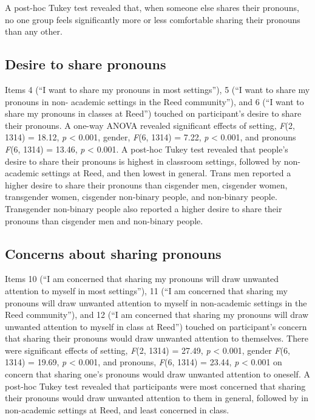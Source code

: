 \documentclass[12pt,twoside]{reedthesis}
\begin{document}
A post-hoc Tukey test revealed that, when someone else shares their pronouns, no one group feels significantly more or less comfortable sharing their pronouns than any other.

\hypertarget{desire-to-share-pronouns}{%
\subsection{Desire to share pronouns}\label{desire-to-share-pronouns}}

Items 4 (``I want to share my pronouns in most settings''), 5 (``I want to share my pronouns in non- academic settings in the Reed community''), and 6 (``I want to share my pronouns in classes at Reed'') touched on participant's desire to share their pronouns. A one-way ANOVA revealed significant effects of setting, \emph{F}(2, 1314) = 18.12, \emph{p} \textless{} 0.001, gender, \emph{F}(6, 1314) = 7.22, \emph{p} \textless{} 0.001, and pronouns \emph{F}(6, 1314) = 13.46, \emph{p} \textless{} 0.001. A post-hoc Tukey test revealed that people's desire to share their pronouns is highest in classroom settings, followed by non-academic settings at Reed, and then lowest in general. Trans men reported a higher desire to share their pronouns than cisgender men, cisgender women, transgender women, cisgender non-binary people, and non-binary people. Transgender non-binary people also reported a higher desire to share their pronouns than cisgender men and non-binary people.

\hypertarget{concerns-about-sharing-pronouns}{%
\subsection{Concerns about sharing pronouns}\label{concerns-about-sharing-pronouns}}

Items 10 (``I am concerned that sharing my pronouns will draw unwanted attention to myself in most settings''), 11 (``I am concerned that sharing my pronouns will draw unwanted attention to myself in non-academic settings in the Reed community''), and 12 (``I am concerned that sharing my pronouns will draw unwanted attention to myself in class at Reed'') touched on participant's concern that sharing their pronouns would draw unwanted attention to themselves. There were significant effects of setting, \emph{F}(2, 1314) = 27.49, \emph{p} \textless{} 0.001, gender \emph{F}(6, 1314) = 19.69, \emph{p} \textless{} 0.001, and pronouns, \emph{F}(6, 1314) = 23.44, \emph{p} \textless{} 0.001 on concern that sharing one's pronouns would draw unwanted attention to oneself. A post-hoc Tukey test revealed that participants were most concerned that sharing their pronouns would draw unwanted attention to them in general, followed by in non-academic settings at Reed, and least concerned in class.
\end{document}
